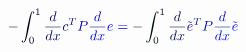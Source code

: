 \documentclass[12pt]{article}
\begin{document}
\makeatletter
\renewcommand*{\@textcolor}[3]{%
  \protect\leavevmode
  \begingroup
    \color#1{#2}#3%
  \endgroup
}
\makeatother
\begin{displaymath}
\mathcolor[RGB]{0,0,15}{-} \mathcolor[RGB]{0,0,30}{\int} _ { \mathcolor[RGB]{0,0,45}{0} } ^ { \mathcolor[RGB]{0,0,60}{1} } \mathcolor[RGB]{0,0,75}{\frac { \mathcolor[RGB]{0,0,90}{d} } { \mathcolor[RGB]{0,0,105}{d} \mathcolor[RGB]{0,0,120}{x} } } \mathcolor[RGB]{0,0,135}{c} ^ { \mathcolor[RGB]{0,0,150}{T} } \mathcolor[RGB]{0,0,165}{P} \mathcolor[RGB]{0,0,180}{\frac { \mathcolor[RGB]{0,0,195}{d} } { \mathcolor[RGB]{0,0,210}{d} \mathcolor[RGB]{0,0,225}{x} } } \mathcolor[RGB]{0,0,240}{e} \mathcolor[RGB]{0,0,255}{=} \mathcolor[RGB]{0,15,0}{-} \mathcolor[RGB]{0,15,15}{\int} _ { \mathcolor[RGB]{0,15,30}{0} } ^ { \mathcolor[RGB]{0,15,45}{1} } \mathcolor[RGB]{0,15,60}{\frac { \mathcolor[RGB]{0,15,75}{d} } { \mathcolor[RGB]{0,15,90}{d} \mathcolor[RGB]{0,15,105}{x} } } \mathcolor[RGB]{0,15,120}{\tilde { \mathcolor[RGB]{0,15,135}{e} } } ^ { \mathcolor[RGB]{0,15,150}{T} } \mathcolor[RGB]{0,15,165}{P} \mathcolor[RGB]{0,15,180}{\frac { \mathcolor[RGB]{0,15,195}{d} } { \mathcolor[RGB]{0,15,210}{d} \mathcolor[RGB]{0,15,225}{x} } } \mathcolor[RGB]{0,15,240}{\tilde { \mathcolor[RGB]{0,15,255}{e} } }
\end{displaymath}
\end{document}
